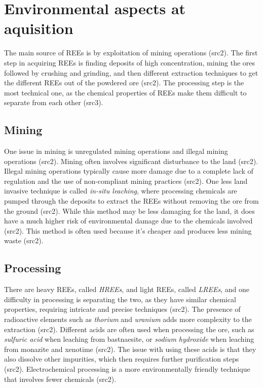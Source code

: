 
\section{Environmental aspects at aquisition}

The main source of REEs is by exploitation of mining operations (src2). The first step in acquiring REEs is finding deposits of high concentration, mining the ores followed by crushing and grinding, and then different extraction techniques to get the different REEs out of the powdered ore (src2). The processing step is the most technical one, as the chemical properties of REEs make them difficult to separate from each other (src3).


\subsection{Mining}

One issue in mining is unregulated mining operations and illegal mining operations (src2). Mining often involves significant disturbance to the land (src2). Illegal mining operations typically cause more damage due to a complete lack of regulation and the use of non-compliant mining practices (src2). One less land invasive technique is called \textit{in-situ leaching}, where processing chemicals are pumped through the deposits to extract the REEs without removing the ore from the ground (src2). While this method may be less damaging for the land, it does have a much higher risk of environmental damage due to the chemicals involved (src2). This method is often used because it's cheaper and produces less mining waste (src2).

\subsection{Processing}

There are heavy REEs, called \textit{HREEs}, and light REEs, called \textit{LREEs}, and one difficulty in processing is separating the two, as they have similar chemical properties, requiring intricate and precise techniques (src2). The presence of radioactive elements such as \textit{thorium} and \textit{uranium} adds more complexity to the extraction (src2). Different acids are often used when processing the ore, such as \textit{sulfuric acid} when leaching from bastnaesite, or \textit{sodium hydroxide} when leaching from monazite and xenotime (src2). The issue with using these acids is that they also dissolve other impurities, which then requires further purification steps (src2). Electrochemical processing is a more environmentally friendly technique that involves fewer chemicals (src2).

